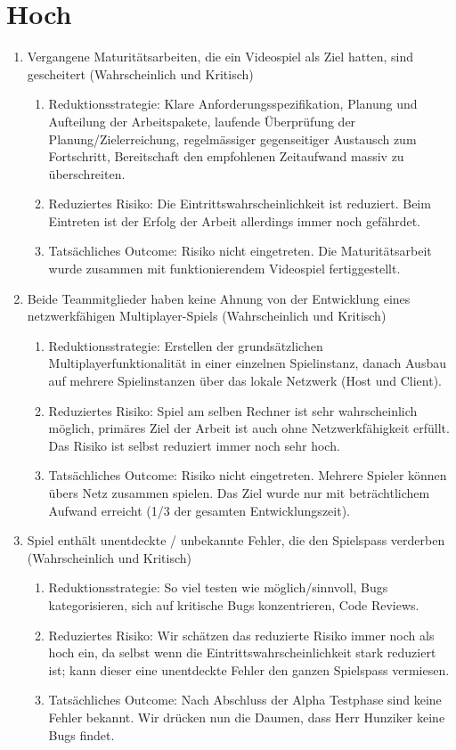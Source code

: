 \section{Hoch}
\begin{enumerate}
    \item Vergangene Maturitätsarbeiten, die ein Videospiel als Ziel hatten, sind gescheitert (Wahrscheinlich und Kritisch)
    \begin{enumerate}
        \item Reduktionsstrategie: Klare Anforderungsspezifikation, Planung und Aufteilung der Arbeitspakete, laufende Überprüfung der Planung/Zielerreichung, regelmässiger gegenseitiger Austausch zum Fortschritt,
        Bereitschaft den empfohlenen Zeitaufwand massiv zu überschreiten.
        \item Reduziertes Risiko: Die Eintrittswahrscheinlichkeit ist reduziert. Beim Eintreten ist der Erfolg der Arbeit allerdings immer noch gefährdet.
        \item Tatsächliches Outcome: Risiko nicht eingetreten. Die Maturitätsarbeit wurde zusammen mit funktionierendem Videospiel fertiggestellt.
    \end{enumerate}

    \item Beide Teammitglieder haben keine Ahnung von der Entwicklung eines netzwerkfähigen Multiplayer-Spiels (Wahrscheinlich und Kritisch)
    \begin{enumerate}
        \item Reduktionsstrategie: Erstellen der grundsätzlichen Multiplayerfunktionalität in einer einzelnen Spielinstanz, danach Ausbau auf mehrere Spielinstanzen über das lokale Netzwerk (Host und Client).
        \item Reduziertes Risiko: Spiel am selben Rechner ist sehr wahrscheinlich möglich, primäres Ziel der Arbeit ist auch ohne Netzwerkfähigkeit erfüllt. Das Risiko ist selbst reduziert immer noch sehr hoch. 
        \item Tatsächliches Outcome: Risiko nicht eingetreten. Mehrere Spieler können übers Netz zusammen spielen. Das Ziel wurde nur mit beträchtlichem Aufwand erreicht (1/3 der gesamten Entwicklungszeit).
    \end{enumerate}

    \item Spiel enthält unentdeckte / unbekannte Fehler, die den Spielspass verderben (Wahrscheinlich und Kritisch)
    \begin{enumerate}
        \item Reduktionsstrategie: So viel testen wie möglich/sinnvoll, Bugs kategorisieren, sich auf kritische Bugs konzentrieren, Code Reviews.
        \item Reduziertes Risiko: Wir schätzen das reduzierte Risiko immer noch als hoch ein, da selbst wenn die Eintrittswahrscheinlichkeit stark reduziert ist; kann dieser eine unentdeckte Fehler den ganzen Spielspass vermiesen.
        \item Tatsächliches Outcome: Nach Abschluss der Alpha Testphase sind keine Fehler bekannt. Wir drücken nun die Daumen, dass Herr Hunziker keine Bugs findet.
    \end{enumerate}


\end{enumerate}
